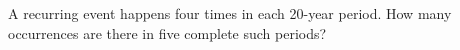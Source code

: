 A recurring event happens four times in each 20-year period. How many occurrences are there in five complete such periods?

